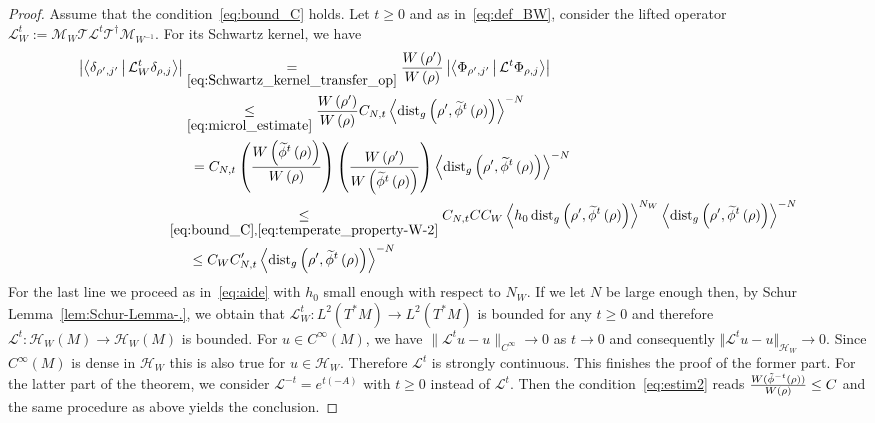 \documentclass[AHL,Unicode,longabstracts,published]{cedram}
\newcommand{\clT}{\mathcal{T}}
\newcommand{\clH}{\mathcal{H}}
\newcommand{\clL}{\mathcal{L}}
\newcommand{\clM}{\mathcal{M}}
\newcommand{\dist}{\mathrm{dist}}
\let\oldtilde\tilde
\renewcommand*{\tilde}[1]{\mathchoice{\widetilde{#1}}{\widetilde{#1}}{\oldtilde{#1}}{\oldtilde{#1}}}
\newcommand{\clH}{\mathcal{H}}
\begin{document}
\begin{proof}
Assume that the condition~\eqref{eq:bound_C} holds. Let $t\geq0$ and as in~\eqref{eq:def_BW}, consider the lifted operator $\clL_{W}^{t}:=\clM_{W}\clT\clL^{t}\clT^{\dagger}\clM_{W^{-1}}.$ For its Schwartz kernel, we have
\begin{align}
\left|\left\langle\delta_{\rho',j'}\,\middle|\,\clL_{W}^{t}\delta_{\rho,j}\right\rangle\right| & \underset{\eqref{eq:Schwartz_kernel_transfer_op}}{=}\frac{W\left(\rho'\right)}{W\left(\rho\right)}\left|\left\langle\Phi_{\rho',j'}\,\middle|\,\clL^{t}\Phi_{\rho,j}\right\rangle\right|\nonumber \\
& \underset{\eqref{eq:microl_estimate}}{\leq}\frac{W\left(\rho'\right)}{W\left(\rho\right)}C_{N,t}\left\langle \dist_{g}\left(\rho',\tilde{\phi}^{t}\left(\rho\right)\right)\right\rangle ^{-N}\nonumber \\
& \mkern09mu =C_{N,t}\left(\frac{W\left(\tilde{\phi}^{t}\left(\rho\right)\right)}{W\left(\rho\right)}\right)\left(\frac{W\left(\rho'\right)}{W\left(\tilde{\phi}^{t}\left(\rho\right)\right)}\right)\left\langle \dist_{g}\left(\rho',\tilde{\phi}^{t}\left(\rho\right)\right)\right\rangle ^{-N}\label{eq:bound}\nonumber
\\
& \mkern-22mu\underset{\eqref{eq:bound_C},\eqref{eq:temperate_property-W-2}}{\leq}C_{N,t}CC_{W}\left\langle h_{0}\,\dist_{g}\left(\rho',\tilde{\phi}^{t}\left(\rho\right)\right)\right\rangle ^{N_{W}}\left\langle \dist_{g}\left(\rho',\tilde{\phi}^{t}\left(\rho\right)\right)\right\rangle ^{-N}\nonumber \\
& \mkern07mu\leq C_{W}C'_{N,t}\left\langle \dist_{g}\left(\rho',\tilde{\phi}^{t}\left(\rho\right)\right)\right\rangle ^{-N}\nonumber
\end{align}
For the last line we proceed as in~\eqref{eq:aide} with $h_{0}$ small enough with respect to $N_{W}$. If we let $N$ be large enough then, by Schur Lemma~\ref{lem:Schur-Lemma-.}, we obtain that $\clL_{W}^{t}:L^{2}(T^{*}M)\rightarrow L^{2}(T^{*}M)$ is bounded for any $t\geq0$ and therefore $\clL^{t}:\clH _{W}(M)\rightarrow\clH _{W}(M)$ is bounded. For $u\in C^{\infty}\left(M\right)$, we have $\|\clL^{t}u-u\|_{C^{\infty}}\to0$ as $t\to0$ and consequently $\Vert \clL^{t}u-u\Vert _{\clH _{W}}\underset{}{\rightarrow}0$. Since $C^{\infty}(M)$ is dense in $\clH _{W}$ this is also true for $u\in\clH _{W}$. Therefore $\clL^{t}$ is strongly continuous. This finishes the proof of the former part. For the latter part of the theorem, we consider $\clL^{-t}=e^{t(-A)}$ with $t\geq0$ instead of $\clL^{t}$. Then the condition~\eqref{eq:estim2} reads $\frac{W(\tilde{\phi}^{-t}(\rho))}{W(\rho)}\leq C$ and the same procedure as above yields the conclusion.
\end{proof}
\vspace*{10pt}
\pagebreak
\end{document}
